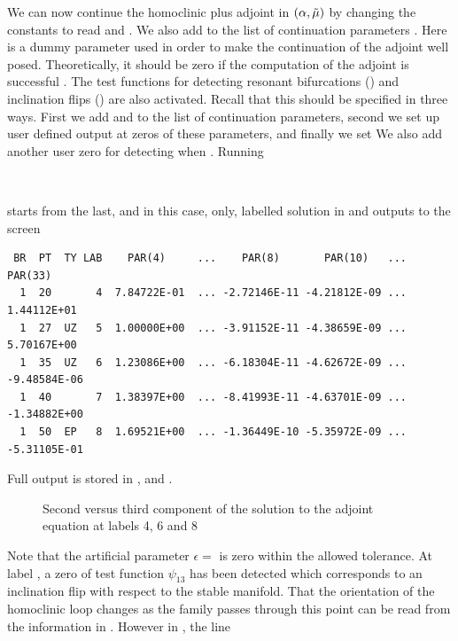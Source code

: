 \documentclass[12pt]{report}
\begin{document}
We can now continue the homoclinic plus
adjoint in $(\alpha,\tilde \mu)$  by
changing the constants to read
 and .
We also add  to the list of continuation parameters
. Here  is a dummy parameter used in
order to make the continuation of the adjoint well posed. Theoretically,
it should be zero if the computation of the adjoint is successful
\cite{Sa:95b}.
The test functions for detecting resonant bifurcations 
() and inclination flips () are
also activated. Recall that this should be specified in
three ways. First we add  and 
to the list of continuation parameters, second we set up user defined
output at zeros of these parameters, and finally we set 
We also add another user zero for detecting when .
Running 
\begin{center}
\\
\end{center}
starts from the last, and in this case, only, labelled solution in 
and outputs to the screen
\begin{verbatim}
 BR  PT  TY LAB    PAR(4)     ...    PAR(8)       PAR(10)   ...    PAR(33)    
  1  20       4  7.84722E-01  ... -2.72146E-11 -4.21812E-09 ...  1.44112E+01
  1  27  UZ   5  1.00000E+00  ... -3.91152E-11 -4.38659E-09 ...  5.70167E+00
  1  35  UZ   6  1.23086E+00  ... -6.18304E-11 -4.62672E-09 ... -9.48584E-06
  1  40       7  1.38397E+00  ... -8.41993E-11 -4.63701E-09 ... -1.34882E+00
  1  50  EP   8  1.69521E+00  ... -1.36449E-10 -5.35972E-09 ... -5.31105E-01
\end{verbatim}
Full output is stored in ,  and . 
\begin{figure}[b]
\epsfysize 9.0cm
\centerline{}
\caption{Second versus third component of the solution to the adjoint
equation at labels 4, 6 and 8}
\label{Ftest1}
\end{figure}
Note that the artificial parameter $\epsilon=$ is zero within
the allowed tolerance. At label , a zero of test function $\psi_{13}$ has
been detected which corresponds to an inclination flip with respect to
the stable manifold. That the orientation of the homoclinic loop
changes as the family passes through this point can be read from
the information in .
However in , the line 
\end{document}
